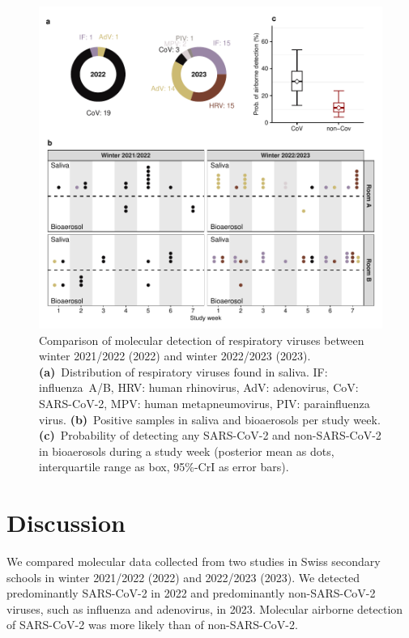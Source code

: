 \documentclass[fleqn,11pt]{wlscirep}
\begin{document}
\begin{figure}
    \centering
    \includegraphics{results/comparison.pdf}
    \caption{Comparison of molecular detection of respiratory viruses between winter 2021/2022 (2022) and winter 2022/2023 (2023). \textbf{(a)}~Distribution of respiratory viruses found in saliva. IF: influenza~A/B, HRV: human rhinovirus, AdV: adenovirus, CoV: SARS-CoV-2, MPV: human metapneumovirus, PIV: parainfluenza virus. \textbf{(b)}~Positive samples in saliva and bioaerosols per study week. \textbf{(c)}~Probability of detecting any SARS-CoV-2 and non-SARS-CoV-2 in bioaerosols during a study week (posterior mean as dots, interquartile range as box, 95\%-CrI as error bars).}
    \label{fig:comparison}
\end{figure}


\section*{Discussion}


We compared molecular data collected from two studies in Swiss secondary schools in winter 2021/2022 (2022) and 2022/2023 (2023). We detected predominantly SARS-CoV-2 in 2022 and predominantly non-SARS-CoV-2 viruses, such as influenza and adenovirus, in 2023. Molecular airborne detection of SARS-CoV-2 was more likely than of non-SARS-CoV-2.
\end{document}
